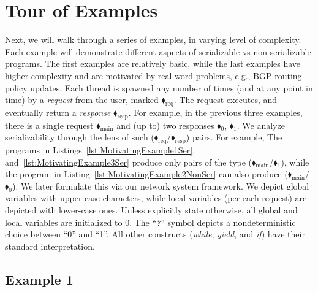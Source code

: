 

\section{Tour of Examples}
\label{sec:tour}

Next, we will walk through a series of examples, in varying level of complexity. Each example will demonstrate different aspects of serializable vs non-serializable programs.
%
The first examples are relatively basic, while the last examples have higher complexity and are motivated by real word problems, e.g., BGP routing policy updates.
%
Each thread is spawned any number of times (and at any point in time) by a \textit{request} from the user, marked {\color{ForestGreen}$\blacklozenge_\text{req}$}. The request executes, and eventually return a \textit{response}  {\color{red}$\blacklozenge_\text{resp}$}.
%
For example, in the previous three examples, there is a single request {\color{ForestGreen}$\blacklozenge_\text{main}$} and (up to) two responses {\color{red}$\blacklozenge_0$}, {\color{red}$\blacklozenge_1$}.
% 
We analyze serializability through the lens of such ({\color{ForestGreen}$\blacklozenge_\text{req}$}/{\color{red}$\blacklozenge_\text{resp}$}) pairs. For example, The programs in Listings~\ref{lst:MotivatingExample1Ser}, and~\ref{lst:MotivatingExample3Ser} produce only pairs of the type ({\color{ForestGreen}$\blacklozenge_\text{main}$}/{\color{red}$\blacklozenge_1$}), while the program in Listing~\ref{lst:MotivatingExample2NonSer} can also produce ({\color{ForestGreen}$\blacklozenge_\text{main}$}/{\color{red}$\blacklozenge_0$}). We later formulate this via our network system framework. 
%
We depict global variables with upper-case characters, while local variables (per each request) are depicted with lower-case ones.
%
Unless explicitly state otherwise, all global and local variables are initialized to 0.
%
The ``\textit{?}'' symbol depicts a nondeterministic choice between ``0'' and ``1''. All other constructs (\textit{while}, \textit{yield}, and \textit{if}) have their standard interpretation.

\subsection{Example 1}


